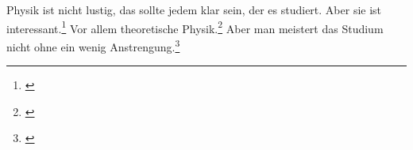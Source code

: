 \documentclass{scrartcl}
\begin{document}
	
Physik ist nicht lustig, das sollte jedem klar sein, der es studiert. Aber sie ist interessant.\footnote{\cite[S. 2]{Demtr}} Vor allem theoretische Physik.\footnote{\cite[S. 5]{Nolt}}
Aber man meistert das Studium nicht ohne ein wenig Anstrengung.\footnote{\cite[S.3]{Bart}}
\printbibliography
\end{document}
